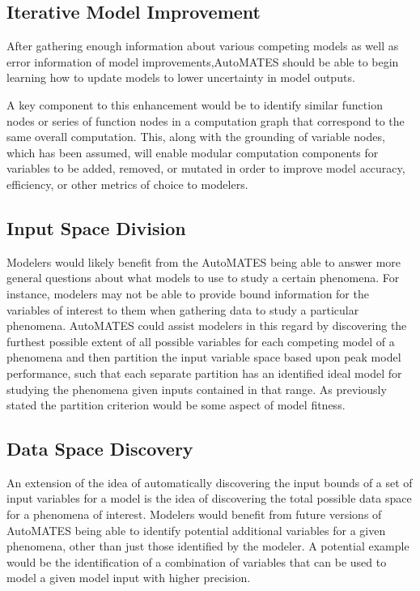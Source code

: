 \subsection{Iterative Model Improvement\label{sec:auto_improve}}
After gathering enough information about various competing models as well as error information of model improvements,AutoMATES should be able to begin learning how to update models to lower uncertainty in model outputs.

A key component to this enhancement would be to identify similar function nodes or series of function nodes in a computation graph that correspond to the same overall computation. This, along with the grounding of variable nodes, which has been assumed, will enable modular computation components for variables to be added, removed, or mutated in order to improve model accuracy, efficiency, or other metrics of choice to modelers.

\subsection{Input Space Division\label{sec:auto_isd}}
Modelers would likely benefit from the AutoMATES being able to answer more general questions about what models to use to study a certain phenomena. For instance, modelers may not be able to provide bound information for the variables of interest to them when gathering data to study a particular phenomena. AutoMATES could assist modelers in this regard by discovering the furthest possible extent of all possible variables for each competing model of a phenomena and then partition the input variable space based upon peak model performance, such that each separate partition has an identified ideal model for studying the phenomena given inputs contained in that range. As previously stated the partition criterion would be some aspect of model fitness.

\subsection{Data Space Discovery\label{sec:auto_dsd}}
An extension of the idea of automatically discovering the input bounds of a set of input variables for a model is the idea of discovering the total possible data space for a phenomena of interest. Modelers would benefit from future versions of AutoMATES being able to identify potential additional variables for a given phenomena, other than just those identified by the modeler. A potential example would be the identification of a combination of variables that can be used to model a given model input with higher precision.
